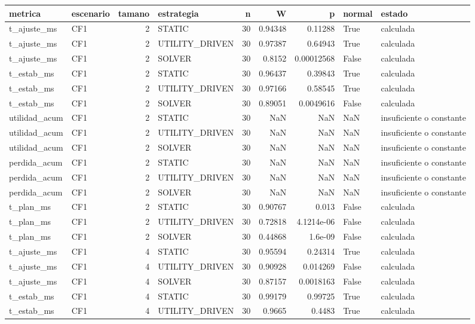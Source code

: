 \begin{tabular}{llrlrrrll}
\toprule
metrica & escenario & tamano & estrategia & n & W & p & normal & estado \\
\midrule
t_ajuste_ms & CF1 & 2 & STATIC & 30 & 0.94348 & 0.11288 & True & calculada \\
t_ajuste_ms & CF1 & 2 & UTILITY_DRIVEN & 30 & 0.97387 & 0.64943 & True & calculada \\
t_ajuste_ms & CF1 & 2 & SOLVER & 30 & 0.8152 & 0.00012568 & False & calculada \\
t_estab_ms & CF1 & 2 & STATIC & 30 & 0.96437 & 0.39843 & True & calculada \\
t_estab_ms & CF1 & 2 & UTILITY_DRIVEN & 30 & 0.97166 & 0.58545 & True & calculada \\
t_estab_ms & CF1 & 2 & SOLVER & 30 & 0.89051 & 0.0049616 & False & calculada \\
utilidad_acum & CF1 & 2 & STATIC & 30 & NaN & NaN & NaN & insuficiente o constante \\
utilidad_acum & CF1 & 2 & UTILITY_DRIVEN & 30 & NaN & NaN & NaN & insuficiente o constante \\
utilidad_acum & CF1 & 2 & SOLVER & 30 & NaN & NaN & NaN & insuficiente o constante \\
perdida_acum & CF1 & 2 & STATIC & 30 & NaN & NaN & NaN & insuficiente o constante \\
perdida_acum & CF1 & 2 & UTILITY_DRIVEN & 30 & NaN & NaN & NaN & insuficiente o constante \\
perdida_acum & CF1 & 2 & SOLVER & 30 & NaN & NaN & NaN & insuficiente o constante \\
t_plan_ms & CF1 & 2 & STATIC & 30 & 0.90767 & 0.013 & False & calculada \\
t_plan_ms & CF1 & 2 & UTILITY_DRIVEN & 30 & 0.72818 & 4.1214e-06 & False & calculada \\
t_plan_ms & CF1 & 2 & SOLVER & 30 & 0.44868 & 1.6e-09 & False & calculada \\
t_ajuste_ms & CF1 & 4 & STATIC & 30 & 0.95594 & 0.24314 & True & calculada \\
t_ajuste_ms & CF1 & 4 & UTILITY_DRIVEN & 30 & 0.90928 & 0.014269 & False & calculada \\
t_ajuste_ms & CF1 & 4 & SOLVER & 30 & 0.87157 & 0.0018163 & False & calculada \\
t_estab_ms & CF1 & 4 & STATIC & 30 & 0.99179 & 0.99725 & True & calculada \\
t_estab_ms & CF1 & 4 & UTILITY_DRIVEN & 30 & 0.9665 & 0.4483 & True & calculada \\

\end{tabular}
